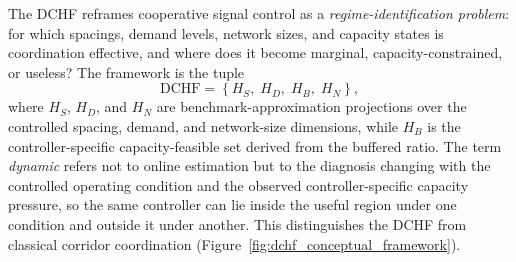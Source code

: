 \documentclass[review,12pt]{elsarticle}
\begin{document}
The DCHF reframes cooperative signal control as a \textit{regime-identification problem}: for which spacings, demand levels, network sizes, and capacity states is coordination effective, and where does it become marginal, capacity-constrained, or useless? The framework is the tuple
\begin{equation}
\mathrm{DCHF} = \left\{H_S,\;H_D,\;H_B,\;H_N\right\},
\label{eq:dchf_definition}
\end{equation}
where $H_S$, $H_D$, and $H_N$ are benchmark-approximation projections over the controlled spacing, demand, and network-size dimensions, while $H_B$ is the controller-specific capacity-feasible set derived from the buffered ratio. The term \emph{dynamic} refers not to online estimation but to the diagnosis changing with the controlled operating condition and the observed controller-specific capacity pressure, so the same controller can lie inside the useful region under one condition and outside it under another. This distinguishes the DCHF from classical corridor coordination
(Figure~\ref{fig:dchf_conceptual_framework}).
\end{document}
